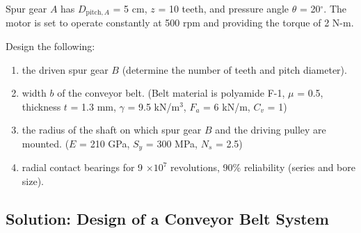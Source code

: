 \documentclass[a4paper,openany,svgnames]{kaobook}
\begin{document}
Spur gear \(A\) has \(D_{\text{pitch},A}\) = 5 cm, \(z\) = 10 teeth, and
pressure angle \(\theta\) = 20\(^{\circ}\). The motor is set to operate
constantly at 500 rpm and providing the torque of 2 N-m.

Design the following:

\begin{enumerate}
\item the driven spur gear \(B\) (determine the number of teeth and pitch
diameter).

\item width \(b\) of the conveyor belt. (Belt material is polyamide F-1,
\(\mu\) = 0.5, thickness \(t\) = 1.3 mm, \(\gamma\) = 9.5
kN/m\(^{3}\), \(F_{a}\) = 6 kN/m, \(C_{v}\) = 1)

\item the radius of the shaft on which spur gear \(B\) and the driving
pulley are mounted. (\(E\) = 210 GPa, \(S_{y}\) = 300 MPa, \(N_{s}\)
= 2.5)

\item radial contact bearings for 9 \(\times 10^{7}\) revolutions, 90\%
reliability (series and bore size).
\end{enumerate}

\subsection{Solution: Design of a Conveyor Belt System}
\label{sec:org05af2be}
\end{document}
